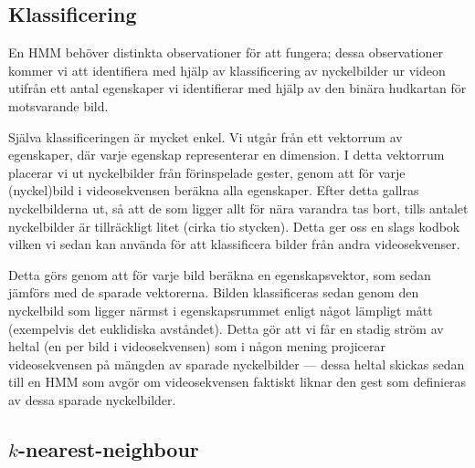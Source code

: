 \documentclass[../rapport_MVEX01-11-05]{subfiles}
\begin{document}
\subsection{Klassificering}
En HMM behöver distinkta observationer för att fungera; dessa
observationer kommer vi att identifiera med hjälp av klassificering av
nyckelbilder ur videon utifrån ett antal egenskaper vi identifierar
med hjälp av den binära hudkartan för motsvarande bild.

Själva klassificeringen är mycket enkel. Vi utgår från ett vektorrum
av egenskaper, där varje egenskap representerar en dimension. I detta
vektorrum placerar vi ut nyckelbilder från förinspelade gester, genom
att för varje (nyckel)bild i videosekvensen beräkna alla egenskaper.
Efter detta gallras nyckelbilderna ut, så att de som ligger allt för
nära varandra tas bort, tills antalet nyckelbilder är tillräckligt
litet (cirka tio stycken).
Detta ger oss en slags kodbok vilken vi sedan kan använda för att
klassificera bilder från andra videosekvenser. 


Detta görs genom att för varje bild beräkna en egenskapsvektor, som
sedan jämförs med de sparade vektorerna. Bilden klassificeras sedan
genom den nyckelbild som ligger närmst i egenskapsrummet enligt något
lämpligt mått (exempelvis det euklidiska avståndet). Detta gör att vi
får en stadig ström av heltal (en per bild i videosekvensen) som i
någon mening projicerar videosekvensen på mängden av sparade
nyckelbilder --- dessa heltal skickas sedan till en HMM som avgör om
videosekvensen faktiskt liknar den gest som definieras av dessa
sparade nyckelbilder.

\subsection{$k$-nearest-neighbour}

%
\end{document}
